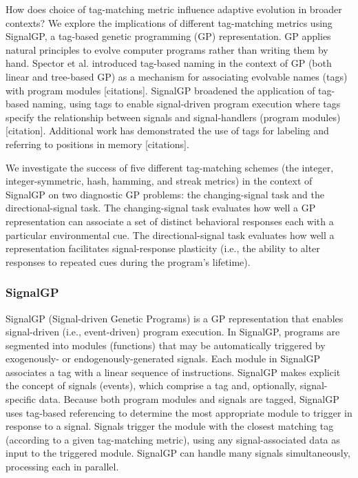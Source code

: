 How does choice of tag-matching metric influence adaptive evolution in broader contexts?
We explore the implications of different tag-matching metrics using SignalGP, a tag-based genetic programming (GP) representation.
GP applies natural principles to evolve computer programs rather than writing them by hand.
Spector et al. introduced tag-based naming in the context of GP (both linear and tree-based GP) as a mechanism for associating evolvable names (tags) with program modules [citations].
SignalGP broadened the application of tag-based naming, using tags to enable signal-driven program execution where tags specify the relationship between signals and signal-handlers (program modules) [citation].
Additional work has demonstrated the use of tags for labeling and referring to positions in memory [citations].

We investigate the success of five different tag-matching schemes (the integer, integer-symmetric, hash, hamming, and streak metrics) in the context of SignalGP on two diagnostic GP problems: the changing-signal
task and the directional-signal task.
The changing-signal task evaluates how well a GP representation can associate a set of distinct behavioral responses each with a particular environmental cue.
The directional-signal task evaluates how well a representation facilitates signal-response plasticity (i.e., the ability to alter responses to repeated cues during the program's lifetime).

\subsubsection{SignalGP}

SignalGP (Signal-driven Genetic Programs) is a GP representation that enables signal-driven (i.e., event-driven) program execution.
In SignalGP, programs are segmented into modules (functions) that may be automatically triggered by exogenously- or endogenously-generated signals.
Each module in SignalGP associates a tag with a linear sequence of instructions.
SignalGP makes explicit the concept of signals (events), which comprise a tag and, optionally, signal-specific data.
Because both program modules and signals are tagged, SignalGP uses tag-based referencing to determine the most appropriate module to trigger in response to a signal.
Signals trigger the module with the closest matching tag (according to a given tag-matching metric), using any signal-associated data as input to the triggered module.
SignalGP can handle many signals simultaneously, processing each in parallel.

